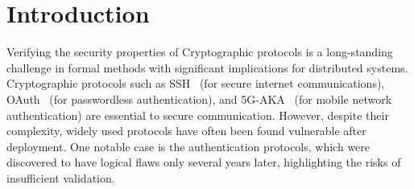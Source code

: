 \documentclass[a4paper,12pt,twoside,openany]{book}
\begin{document}
\setcounter{page}{1}
\section*{Introduction}


Verifying the security properties of Cryptographic protocols is a long-standing challenge in formal methods with significant implications for distributed systems. Cryptographic protocols such as SSH~\cite{ssh} (for secure internet communications), OAuth~\cite{oauth} (for passwordless authentication), and 5G-AKA~\cite{5gaka} (for mobile network authentication) are essential to secure communication. However, despite their complexity, widely used protocols have often been found vulnerable after deployment. One notable case is the \cite{needhamschroeder} authentication protocols, which were discovered to have logical flaws only several years later, highlighting the risks of insufficient validation.
\end{document}
